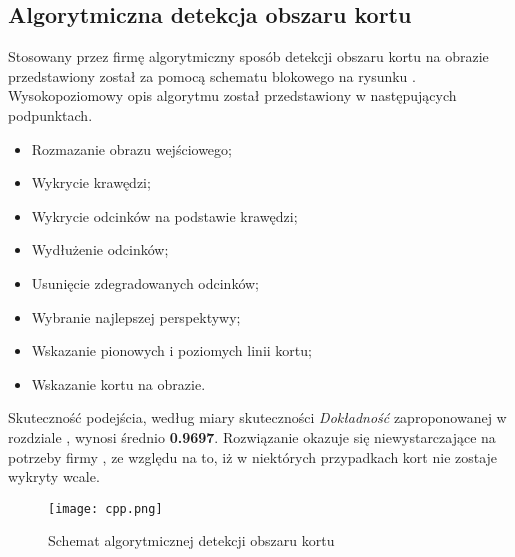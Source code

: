 \subsection{Algorytmiczna detekcja obszaru kortu}

Stosowany przez firmę \blue{} algorytmiczny sposób detekcji obszaru kortu na obrazie przedstawiony został za pomocą schematu blokowego na rysunku . Wysokopoziomowy opis algorytmu został przedstawiony w następujących podpunktach.

\begin{itemize}
  \item Rozmazanie obrazu wejściowego;
  \item Wykrycie krawędzi;
  \item Wykrycie odcinków na podstawie krawędzi;
  \item Wydłużenie odcinków;
  \item Usunięcie zdegradowanych odcinków;
  \item Wybranie najlepszej perspektywy;
  \item Wskazanie pionowych i poziomych linii kortu;
  \item Wskazanie kortu na obrazie.
\end{itemize}

Skuteczność podejścia, według miary skuteczności \textit{Dokładność} zaproponowanej w rozdziale , wynosi średnio \textbf{0.9697}.
Rozwiązanie okazuje się niewystarczające na potrzeby firmy \blue{}, ze względu na to, iż w niektórych przypadkach kort nie zostaje wykryty wcale.

\begin{figure}[h]
  \centering
  \caption{Schemat algorytmicznej detekcji obszaru kortu}
  \texttt{[image: cpp.png]}
  \label{fig:algcpp}
\end{figure}
